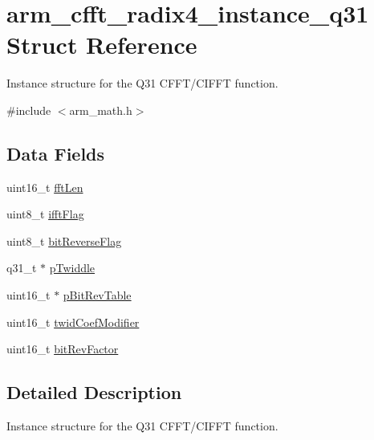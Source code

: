 \hypertarget{structarm__cfft__radix4__instance__q31}{\section{arm\-\_\-cfft\-\_\-radix4\-\_\-instance\-\_\-q31 Struct Reference}
\label{structarm__cfft__radix4__instance__q31}
}


Instance structure for the Q31 C\-F\-F\-T/\-C\-I\-F\-F\-T function.  




{\ttfamily \#include $<$arm\-\_\-math.\-h$>$}

\subsection*{Data Fields}
\begin{DoxyCompactItemize}
\item 
uint16\-\_\-t \hyperlink{structarm__cfft__radix4__instance__q31_ab8db3bbe7c61e6bb8ca2a55e3446e11a}{fft\-Len}
\item 
uint8\-\_\-t \hyperlink{structarm__cfft__radix4__instance__q31_ad6ca6e223f986ebfd94c5ee1e410aa73}{ifft\-Flag}
\item 
uint8\-\_\-t \hyperlink{structarm__cfft__radix4__instance__q31_a09a221a818c6d0e064557a99e2fe9a8b}{bit\-Reverse\-Flag}
\item 
q31\-\_\-t $\ast$ \hyperlink{structarm__cfft__radix4__instance__q31_a2505b7d5ec077b244c712797a5253b6d}{p\-Twiddle}
\item 
uint16\-\_\-t $\ast$ \hyperlink{structarm__cfft__radix4__instance__q31_a46a2fb328199897af100fea0bfdf59aa}{p\-Bit\-Rev\-Table}
\item 
uint16\-\_\-t \hyperlink{structarm__cfft__radix4__instance__q31_afe772e5b5001c9d8e85032115a8df5bf}{twid\-Coef\-Modifier}
\item 
uint16\-\_\-t \hyperlink{structarm__cfft__radix4__instance__q31_a33386d95319dc3ee7097b3a8e52e01ec}{bit\-Rev\-Factor}
\end{DoxyCompactItemize}


\subsection{Detailed Description}
Instance structure for the Q31 C\-F\-F\-T/\-C\-I\-F\-F\-T function. 

